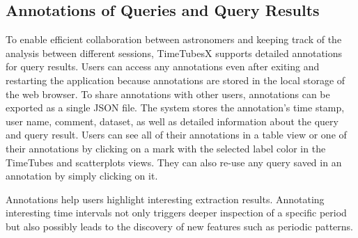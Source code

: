 \subsection{Annotations of Queries and Query Results}
%
To enable efficient collaboration between astronomers and keeping track of the analysis between different sessions, TimeTubesX supports detailed annotations for query results.
%
Users can access any annotations even after exiting and restarting the application because annotations are stored in the local storage of the web browser. 
To share annotations with other users, annotations can be exported as a single JSON file. 
The system stores the annotation's time stamp, user name, comment, dataset, as well as detailed information about the query and query result.
Users can see all of their annotations in a table view or one of their annotations by clicking on a mark with the selected label color in the TimeTubes and scatterplots views.
They can also re-use any query saved in an annotation by simply clicking on it. %

Annotations help users highlight interesting extraction results.
%
%
Annotating interesting time intervals not only triggers deeper inspection of a specific period 
but also possibly leads to the discovery of new features such as periodic patterns.






